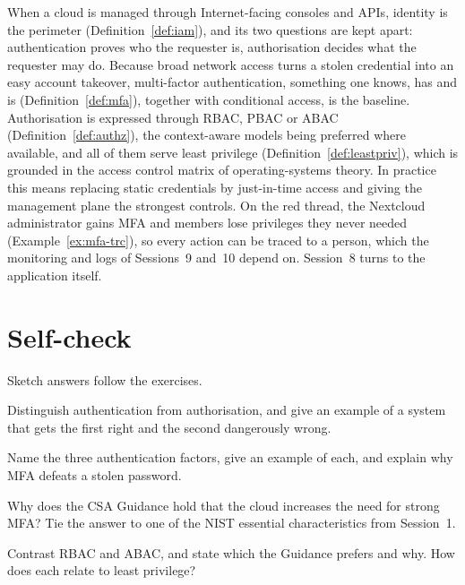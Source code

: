 When a cloud is managed through Internet-facing consoles and APIs, identity
is the perimeter (Definition~\ref{def:iam}), and its two questions are kept
apart: authentication proves who the requester is, authorisation decides
what the requester may do. Because broad network access turns a stolen
credential into an easy account takeover, multi-factor authentication,
something one knows, has and is (Definition~\ref{def:mfa}), together with
conditional access, is the baseline. Authorisation is expressed through
RBAC, PBAC or ABAC (Definition~\ref{def:authz}), the context-aware models
being preferred where available, and all of them serve least privilege
(Definition~\ref{def:leastpriv}), which is grounded in the access control
matrix of operating-systems theory. In practice this means replacing static
credentials by just-in-time access and giving the management plane the
strongest controls. On the red thread, the Nextcloud administrator gains MFA
and members lose privileges they never needed (Example~\ref{ex:mfa-trc}), so
every action can be traced to a person, which the monitoring and logs of
Sessions~9 and~10 depend on. Session~8 turns to the application itself.

\section*{Self-check}

Sketch answers follow the exercises.

\begin{exercise}
Distinguish authentication from authorisation, and give an example of a system
that gets the first right and the second dangerously wrong.
\end{exercise}

\begin{exercise}
Name the three authentication factors, give an example of each, and explain
why MFA defeats a stolen password.
\end{exercise}

\begin{exercise}
Why does the CSA Guidance hold that the cloud increases the need for strong
MFA? Tie the answer to one of the NIST essential characteristics from
Session~1.
\end{exercise}

\begin{exercise}
Contrast RBAC and ABAC, and state which the Guidance prefers and why. How does
each relate to least privilege?
\end{exercise}

